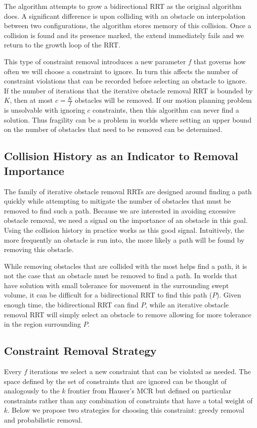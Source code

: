 The algorithm attempts to grow a bidirectional RRT as the original algorithm does. A significant difference is upon colliding with an obstacle on interpolation between two configurations, the algorithm stores memory of this collision. Once a collision is found and its presence marked, the extend immediately fails and we return to the growth loop of the RRT. 

This type of constraint removal introduces a new parameter $f$ that governs how often we will choose a constraint to ignore. In turn this affects the number of constraint violations that can be recorded before selecting an obstacle to ignore. If the number of iterations that the iterative obstacle removal RRT is bounded by $K$, then at most $c=\frac{K}{f}$ obstacles will be removed. If our motion planning problem is unsolvable with ignoring $c$ constraints, then this algorithm can never find a solution. Thus fragility can be a problem in worlds where setting an upper bound on the number of obstacles that need to be removed can be determined.

\subsection{Collision History as an Indicator to Removal Importance}
The family of iterative obstacle removal RRTs are designed around finding a path quickly while attempting to mitigate the number of obstacles that must be removed to find such a path. Because we are interested in avoiding excessive obstacle removal, we need a signal on the importance of an obstacle in this goal. Using the collision history in practice works as this good signal. Intuitively, the more frequently an obstacle is run into, the more likely a path will be found by removing this obstacle.

While removing obstacles that are collided with the most helps find a path, it is not the case that an obstacle must be removed to find a path. In worlds that have solution with small tolerance for movement in the surrounding swept volume, it can be difficult for a bidirectional RRT to find this path ($P$). Given enough time, the bidirectional RRT can find $P$, while an iterative obstacle removal RRT will simply select an obstacle to remove allowing for more tolerance in the region surrounding $P$.

\subsection{Constraint Removal Strategy}
Every $f$ iterations we select a new constraint that can be violated as needed. The space defined by the set of constraints that are ignored can be thought of analogously to the $k$ frontier from Hauser's MCR but defined on particular constraints rather than any combination of constraints that have a total weight of $k$. Below we propose two strategies for choosing this constraint: greedy removal and probabilistic removal.
